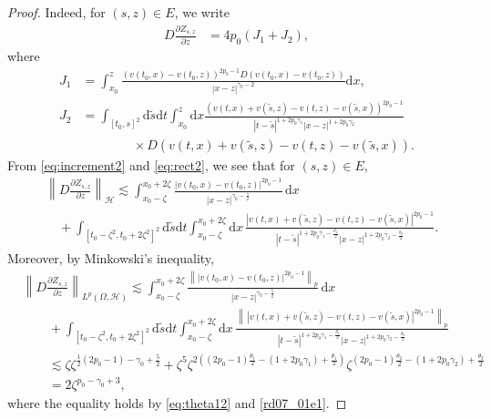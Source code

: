 \documentclass[12pt,a4paper]{article}
\renewcommand{\d}{\mathrm{d}}
\newcommand {\deltah}{{\zeta}}
\newcommand {\half}{\frac 12}
\newcommand{\<}{\langle}
\renewcommand{\>}{\rangle}
\begin{document}
\begin{proof}
 Indeed, for $(s,z)\in E$, we write
           \begin{align*}
           D\frac{\partial Z_{s,z}}{\partial z}&=
           4p_0(J_1+J_2),
           \end{align*}
           where 
\begin{align*}
     J_1&=\int_{x_0}^z \frac {(v(t_0,x)-v(t_0,z))^{2p_0-1}  D(v(t_0, x)-v(t_0,z))}{|x-z|^{\gamma_0-2} }\d x, \\[7pt]
           J_2&=\int_{[t_0, s]^2}\d \tilde{s}\d t \int_{x_0}^z \d x\frac {(v(t,x)+v(\tilde{s},z)-v(t,z)-v(\tilde{s},x))^{2p_0-1}
             }{|t-\tilde{s}|^{1+2p_0\gamma_1}|x-z|^{1+2p_0\gamma_2}} \\
              &\qquad\qquad \times D(v(t,x)+v(\tilde{s},z)-v(t,z)-v(\tilde{s},x)).
\end{align*}
From \eqref{eq:increment2} and \eqref{eq:rect2}, we see that for $(s,z)\in E$,
           \begin{align*}
           &\left\|D\frac{\partial Z_{s,z}}{\partial z}\right\|_{\mathcal{H}}\lesssim 
           \int_{x_0-\deltah}^{x_0+2\deltah} \frac {|v(t_0,x)-v(t_0,z)|^{2p_0-1}}{|x-z|^{\gamma_0-\frac52} }\, \d x\\
           &\quad + \int_{[t_0-\deltah^2, t_0+2\deltah^2]^2}\d \tilde{s}\d t \int_{x_0-\deltah}^{x_0+2\deltah} \d x \, 
            \frac {|v(t,x)+v(\tilde{s},z)-v(t,z)-v(\tilde{s},x)|^{2p_0-1}
             }{|t-\tilde{s}|^{1+2p_0\gamma_1-\frac{\theta_1}{2}}|x-z|^{1+2p_0\gamma_2-\frac{\theta_2}{2}}}.
           \end{align*}
           Moreover, by Minkowski's inequality, 
          \begin{align*}
           &\left\|D\frac{\partial Z_{s,z}}{\partial z}\right\|_{L^p(\Omega, \mathcal{H})}\lesssim 
           \int_{x_0-\deltah}^{x_0+2\deltah} \frac {\left\||v(t_0,x)-v(t_0,z)|^{2p_0-1}\right\|_{p}}{|x-z|^{\gamma_0-\frac52} }\, \d x\\
           &\qquad+ \int_{[t_0-\deltah^2, t_0+2\deltah^2]^2}\d \tilde{s}\d t \int_{x_0-\deltah}^{x_0+2\deltah} \d x \, 
            \frac {\left\|\, |v(t,x)+v(\tilde{s},z)-v(t,z)-v(\tilde{s},x)|^{2p_0-1}\right\|_{p}
             }{|t-\tilde{s}|^{1+2p_0\gamma_1-\frac{\theta_1}{2}}|x-z|^{1+2p_0\gamma_2-\frac{\theta_2}{2}}}\\
             &\qquad   \lesssim \deltah \deltah^{\half (2p_0 -1) -\gamma_0+\frac 5 2} + \deltah^{5}\deltah^{2((2p_0-1)\frac{\theta_1}{2} -(1+2p_0\gamma_1)+\frac{\theta_1}{2})}\deltah^{(2p_0-1)\frac{\theta_2}{2}-(1+2p_0\gamma_2)+\frac{\theta_2}{2}}\\
             &\qquad=2\deltah^{p_0-\gamma_0+3},
           \end{align*}
           where the equality holds by \eqref{eq:theta12} and \eqref{rd07_01e1}.
\medskip
   

\end{proof}
\end{document}
